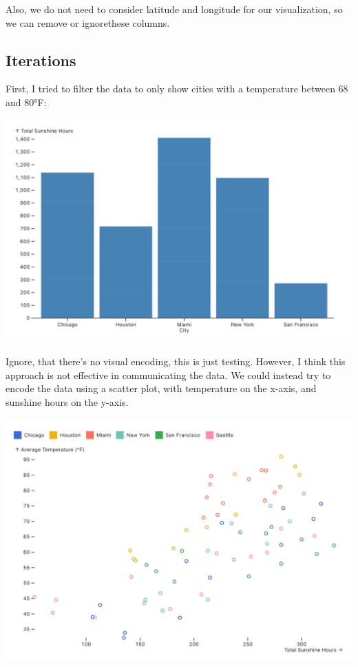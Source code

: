\documentclass{article}
\begin{document}
Also, we do not need to consider latitude and longitude for our visualization, so we can remove or ignorethese columns.

\pagebreak

\subsection{Iterations}
First, I tried to filter the data to only show cities with a temperature between 68 and 80°F: 

\begin{center}
    \includegraphics[width=\textwidth]{filter.png}
\end{center}

Ignore, that there's no visual encoding, this is just testing. However, I think this approach is not effective
in communicating the data. We could instead try to encode the data using a scatter plot, with temperature on the x-axis, and sunshine hours on the y-axis.

\begin{center}
    \includegraphics[scale=0.2]{scatter.png}
\end{center}
\end{document}
